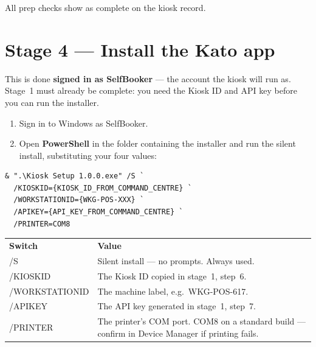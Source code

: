 \documentclass[a4paper,10pt]{article}
\newcommand{\wpath}[1]{{\ttfamily\small #1}}
\begin{document}
\begin{wkinfo}
All prep checks show as complete on the kiosk record.
\end{wkinfo}

\section{Stage 4 --- Install the Kato app}

This is done \textbf{signed in as \wpath{SelfBooker}} --- the account the
kiosk will run as. Stage~1 must already be complete: you need the Kiosk ID
and API key before you can run the installer.

\begin{enumerate}
  \item Sign in to Windows as \wpath{SelfBooker}.

  \item Open \textbf{PowerShell} in the folder containing the installer
        and run the silent install, substituting your four values:
\end{enumerate}

\begin{lstlisting}
& ".\Kiosk Setup 1.0.0.exe" /S `
  /KIOSKID={KIOSK_ID_FROM_COMMAND_CENTRE} `
  /WORKSTATIONID={WKG-POS-XXX} `
  /APIKEY={API_KEY_FROM_COMMAND_CENTRE} `
  /PRINTER=COM8
\end{lstlisting}

\begin{center}
\renewcommand{\arraystretch}{1.3}\small
\begin{tabularx}{\textwidth}{L{34mm} X}
\color{white}\textbf{Switch} &
\color{white}\textbf{Value}\\
\wpath{/S} & Silent install --- no prompts. Always used.\\
\wpath{/KIOSKID} & The Kiosk ID copied in stage~1, step~6.\\
\wpath{/WORKSTATIONID} & The machine label, e.g.\ \wpath{WKG-POS-617}.\\
\wpath{/APIKEY} & The API key generated in stage~1, step~7.\\
\wpath{/PRINTER} & The printer's COM port. \wpath{COM8} on a standard
build --- confirm in Device Manager if printing fails.\\
\end{tabularx}
\end{center}
\end{document}
